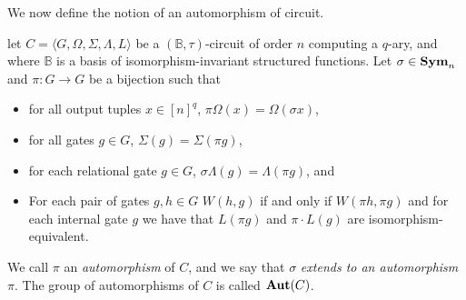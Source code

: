 \documentclass[../paper.tex]{subfiles}
\begin{document}


We now define the notion of an automorphism of circuit.

\begin{definition}[Automorphism]
  let $C = \langle G, \Omega, \Sigma, \Lambda, L\rangle$ be a
  $(\mathbb{B},\tau)$-circuit of order $n$ computing a $q$-ary, and where
  $\mathbb{B}$ is a basis of isomorphism-invariant structured functions. Let
  $\sigma \in \text{\textbf{Sym}}_n$ and $\pi: G \rightarrow G$ be a bijection such that
  \begin{itemize}
    \setlength\itemsep{0mm}
  \item for all output tuples $x \in [n]^q$, $\pi \Omega (x) = \Omega (\sigma
    x)$,
  \item for all gates $g \in G$, $\Sigma (g) = \Sigma (\pi g)$,
  \item for each relational gate $g \in G$, $\sigma \Lambda (g) = \Lambda (\pi
    g)$, and
  \item For each pair of gates $g, h \in G$ $W(h,g)$ if and only if $W(\pi h,
    \pi g)$ and for each internal gate $g$ we have that $L(\pi g)$ and $ \pi
    \cdot L(g)$ are isomorphism-equivalent.
  \end{itemize}
  We call $\pi$ an \emph{automorphism} of $C$, and we say that $\sigma$
  \emph{extends to an automorphism} $\pi$. The group of automorphisms of $C$ is
  called $\text{\textbf{Aut}} (C)$.
\end{definition}
\end{document}
